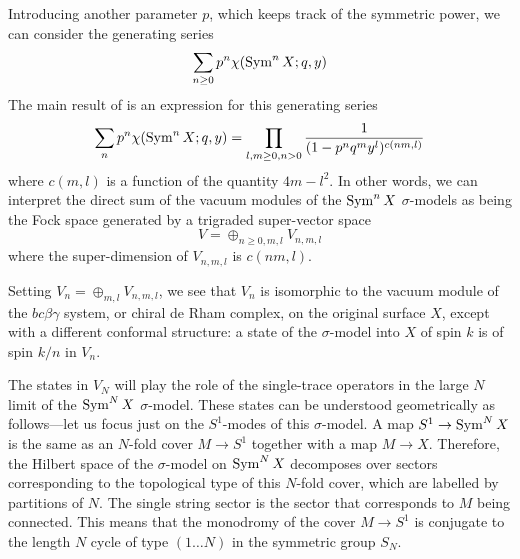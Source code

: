 \documentclass[../main.tex]{subfiles}
\begin{document}
Introducing another parameter $p$, which keeps track of the symmetric power, we can consider the generating series
\begin{equation} 
	\sum_{n \geq 0} p^n \chi(\operatorname{Sym}^n X; q,y) 
\end{equation}
The main result of \cite{deBoerEG, DMVV} is an expression for this generating series
\begin{equation} 
	\sum_{n} p^n \chi(\operatorname{Sym}^n X; q,y) = \prod_{l,m \geq 0,n >0 } \frac{1}{(1 - p^n q^m y^l)^{c(nm,l)}}
\end{equation}
where $c(m,l)$ is a function of the quantity $4m-l^2$.
In other words, we can interpret the direct sum of the vacuum modules of the $\operatorname{Sym}^n X$ $\sigma$-models as being the Fock space generated by a trigraded super-vector space 
\begin{equation} 
	V =\oplus_{n \ge 0,m,l} V_{n,m,l} 
\end{equation}
where the super-dimension of $V_{n,m,l}$ is $c(nm,l)$.

Setting $V_n = \oplus_{m,l} V_{n,m,l}$, we see that $V_n$ is isomorphic to the vacuum module of the $bc\beta\gamma$ system, or chiral de Rham complex, on the original surface $X$, except with a different conformal structure: a state of the $\sigma$-model into $X$ of spin $k$ is of spin $k/n$ in $V_n$.  

The states in $V_N$ will play the role of the single-trace operators in the large $N$ limit of the $\operatorname{Sym}^N X$ $\sigma$-model.   
These states can be understood geometrically as follows---let us focus just on the $S^1$-modes of this $\sigma$-model.
A map $S^1 \to \operatorname{Sym}^N X$ is the same as an $N$-fold cover $M \to S^1$ together with a map $M \to X$.  
Therefore, the Hilbert space of the $\sigma$-model on $\operatorname{Sym}^N X$ decomposes over sectors corresponding to the topological type of this $N$-fold cover, which are labelled by partitions of $N$. 
The single string sector is the sector that corresponds to $M$ being connected. 
This means that the monodromy of the cover $M \to  S^1$ is conjugate to the length $N$ cycle of type $(1 \dots N)$ in the symmetric group $S_N$.  
\end{document}
